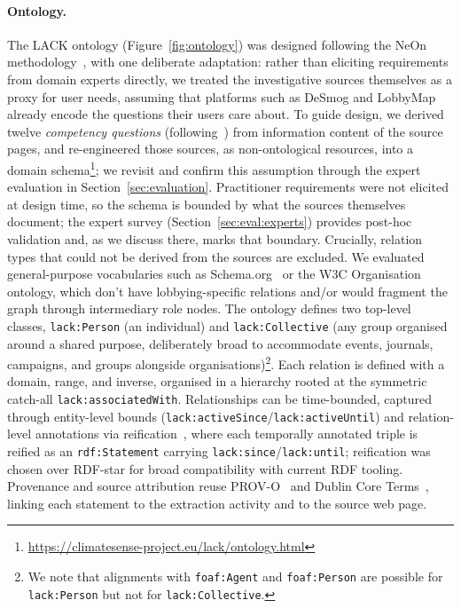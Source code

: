 \begin{sloppypar}
\vspace{-0.3cm}\paragraph{Ontology.}
The LACK ontology (Figure~\ref{fig:ontology}) was designed following the NeOn methodology~\cite{suarez2011neon}, with one deliberate adaptation: rather than eliciting requirements from domain experts directly, we treated the investigative sources themselves as a proxy for user needs, assuming that platforms such as DeSmog and LobbyMap already encode the questions their users care about.
To guide design, we derived twelve \textit{competency questions} (following~\cite{suarez2011neon}) from information content of the source pages, and re-engineered those sources, as non-ontological resources, into a domain schema\footnote{\url{https://climatesense-project.eu/lack/ontology.html}}; we revisit and confirm this assumption through the expert evaluation in Section~\ref{sec:evaluation}.
Practitioner requirements were not elicited at design time, so the schema is bounded by what the sources themselves document; the expert survey (Section~\ref{sec:eval:experts}) provides post-hoc validation and, as we discuss there, marks that boundary.
Crucially, relation types that could not be derived from the sources are excluded.
We evaluated general-purpose vocabularies such as Schema.org~\cite{schemaorg} or the W3C Organisation ontology, which don't have lobbying-specific relations and/or would fragment the graph through intermediary role nodes.
The ontology defines two top-level classes, \texttt{lack:Person} (an individual) and \texttt{lack:Collective} (any group organised around a shared purpose, deliberately broad to accommodate events, journals, campaigns, and groups alongside organisations)\footnote{We note that alignments with \texttt{foaf:Agent} and \texttt{foaf:Person} are possible for \texttt{lack:Person} but not for \texttt{lack:Collective}.}.
Each relation is defined with a domain, range, and inverse, organised in a hierarchy rooted at the symmetric catch-all \texttt{lack:associatedWith}.
Relationships can be time-bounded, captured through entity-level bounds (\texttt{lack:activeSince}/\texttt{lack:activeUntil}) and relation-level annotations via reification~\cite{rdfprimer}, where each temporally annotated triple is reified as an \texttt{rdf:Statement} carrying \texttt{lack:since}/\texttt{lack:until}; reification was chosen over RDF-star for broad compatibility with current RDF tooling.
Provenance and source attribution reuse PROV-O~\cite{provo} and Dublin Core Terms~\cite{dcterms}, linking each statement to the extraction activity and to the source web page.\end{sloppypar}


